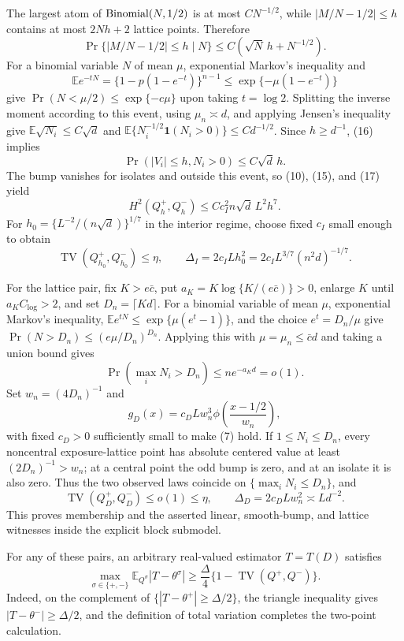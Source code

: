 The largest atom of \({\rm Binomial}(N,1/2)\) is at most \(CN^{-1/2}\), while \(|M/N-1/2|\leq h\) contains at most \(2Nh+2\) lattice points.  Therefore
\[
 \Pr\{|M/N-1/2|\leq h\mid N\}\leq C(\sqrt N\,h+N^{-1/2}).
\tag{16}
\]
For a binomial variable \(N\) of mean \(\mu\), exponential Markov's inequality and
\[
 \mathbb E e^{-tN}=\{1-p(1-e^{-t})\}^{n-1}
 \leq\exp\{-\mu(1-e^{-t})\}
\]
give \(\Pr(N<\mu/2)\leq\exp\{-c\mu\}\) upon taking \(t=\log2\).  Splitting the inverse moment according to this event, using \(\mu_n\asymp d\), and applying Jensen's inequality give \(\mathbb E\sqrt{N_i}\leq C\sqrt d\) and \(\mathbb E\{N_i^{-1/2}\mathbf1(N_i>0)\}\leq Cd^{-1/2}\).  Since \(h\geq d^{-1}\), (16) implies
\[
 \Pr(|V_i|\leq h,N_i>0)\leq C\sqrt d\,h.
\tag{17}
\]
The bump vanishes for isolates and outside this event, so (10), (15), and (17) yield
\[
 H^2(Q_h^+,Q_h^-)\leq Cc_I^2n\sqrt d\,L^2h^7.
\tag{18}
\]
For \(h_0=\{L^{-2}/(n\sqrt d)\}^{1/7}\) in the interior regime, choose fixed \(c_I\) small enough to obtain
\[
 \operatorname{TV}(Q_{h_0}^+,Q_{h_0}^-)\leq\eta,
 \qquad \Delta_I=2c_ILh_0^2
 =2c_IL^{3/7}(n^2d)^{-1/7}.
\tag{19}
\]

For the lattice pair, fix \(K>e\bar c\), put \(a_K=K\log\{K/(e\bar c)\}>0\), enlarge \(K\) until \(a_KC_{\log}>2\), and set \(D_n=\lceil Kd\rceil\).  For a binomial variable of mean \(\mu\), exponential Markov's inequality, \(\mathbb E e^{tN}\leq\exp\{\mu(e^t-1)\}\), and the choice \(e^t=D_n/\mu\) give \(\Pr(N>D_n)\leq(e\mu/D_n)^{D_n}\).  Applying this with \(\mu=\mu_n\leq\bar c d\) and taking a union bound gives
\[
 \Pr(\max_iN_i>D_n)\leq ne^{-a_Kd}=o(1).
\tag{20}
\]
Set \(w_n=(4D_n)^{-1}\) and
\[
 g_D(x)=c_DLw_n^3\phi\!\left(\frac{x-1/2}{w_n}\right),
\tag{21}
\]
with fixed \(c_D>0\) sufficiently small to make (7) hold.  If \(1\leq N_i\leq D_n\), every noncentral exposure-lattice point has absolute centered value at least \((2D_n)^{-1}>w_n\); at a central point the odd bump is zero, and at an isolate it is also zero.  Thus the two observed laws coincide on \(\{\max_iN_i\leq D_n\}\), and
\[
 \operatorname{TV}(Q_D^+,Q_D^-)
 \leq o(1)\leq\eta,
 \qquad \Delta_D=2c_DLw_n^2\asymp Ld^{-2}.
\tag{22}
\]
This proves membership and the asserted linear, smooth-bump, and lattice witnesses inside the explicit block submodel.

For any of these pairs, an arbitrary real-valued estimator \(T=T(D)\) satisfies
\[
 \max_{\sigma\in\{+,-\}}\mathbb E_{Q^\sigma}|T-\theta^\sigma|
 \geq\frac\Delta4\{1-\operatorname{TV}(Q^+,Q^-)\}.
\tag{23}
\]
Indeed, on the complement of \(\{|T-\theta^+|\geq\Delta/2\}\), the triangle inequality gives \(|T-\theta^-|\geq\Delta/2\), and the definition of total variation completes the two-point calculation.

